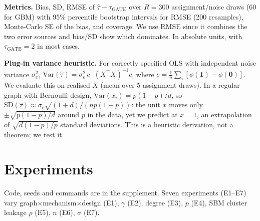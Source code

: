 \documentclass{article}
\begin{document}
\textbf{Metrics.} Bias, SD, RMSE of $\hat\tau-\tau_{\mathrm{GATE}}$ over $R=300$ assignment/noise draws (60 for GBM) with 95\% percentile bootstrap intervals for RMSE (200 resamples), Monte-Carlo SE of the bias, and coverage. We use RMSE since it combines the two error sources and bias/SD show which dominates. In absolute units, with $\tau_{\mathrm{GATE}}=2$ in most cases.

\textbf{Plug-in variance heuristic.} For correctly specified OLS with independent noise variance $\sigma_e^2$, $\mathrm{Var}(\hat\tau)=\sigma_e^2\,c^\top(X^\top X)^{-1}c$, where $c=\frac1n\sum_i[\phi(\mathbf1)-\phi(\mathbf0)]$. We evaluate this on realised $X$ (mean over 5 assignment draws). In a regular graph with Bernoulli design, $\mathrm{Var}(x_i)=p(1-p)/d$, so $\mathrm{SD}(\hat\tau)\approx\sigma_e\sqrt{(1+d)/(np(1-p))}$: the unit $x$ moves only $\pm\sqrt{p(1-p)/d}$ around $p$ in the data, yet we predict at $x=1$, an extrapolation of $\sqrt{d(1-p)/p}$ standard deviations. This is a heuristic derivation, not a theorem; we test it.

\section{Experiments}
Code, seeds and commands are in the supplement. Seven experiments (E1--E7) vary graph$\times$mechanism$\times$design (E1), $\gamma$ (E2), degree (E3), $p$ (E4), SBM cluster leakage $\rho$ (E5), $n$ (E6), $\sigma$ (E7).
\end{document}
